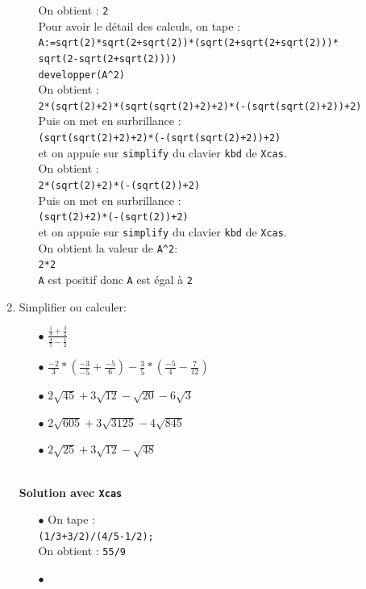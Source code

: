 \documentclass[a4paper,11pt]{book}
\begin{document}
\begin{enumerate}
\begin{itemize}
On obtient : {\tt 2}\\
Pour avoir le d\'etail des calculs, on tape :\\
{\tt A:=sqrt(2)*sqrt(2+sqrt(2))*(sqrt(2+sqrt(2+sqrt(2)))*\\sqrt(2-sqrt(2+sqrt(2))))}\\
{\tt developper(A\verb|^|2)}\\
On obtient :\\
{\tt 2*(sqrt(2)+2)*(sqrt(sqrt(2)+2)+2)*(-(sqrt(sqrt(2)+2))+2)}\\
Puis on met en surbrillance : \\
{\tt (sqrt(sqrt(2)+2)+2)*(-(sqrt(sqrt(2)+2))+2)}\\
et on appuie sur {\tt simplify} du clavier {\tt kbd} de {\tt Xcas}.\\
On obtient :\\
{\tt 2*(sqrt(2)+2)*(-(sqrt(2))+2)}\\
Puis on met en surbrillance : \\
{\tt (sqrt(2)+2)*(-(sqrt(2))+2)}\\
et on appuie sur {\tt simplify} du clavier {\tt kbd} de {\tt Xcas}.\\
On obtient la valeur de {\tt A\verb|^|2}:\\
{\tt 2*2}\\
{\tt A} est positif donc {\tt A} est \'egal \`a {\tt 2}
\end{itemize}
\item Simplifier ou calculer:
\begin{itemize}
\item[$\bullet$] $\displaystyle \frac{\displaystyle\frac{1}{3}+\frac{3}{2}}{\displaystyle\frac{4}{5}-\frac{1}{2}}$
\item[$\bullet$] $\displaystyle \frac{-2}{3}*(\frac{-3}{-5}+\frac{-5}{6})-\frac{3}{5}*(\frac{-5}{4}-\frac{7}{12})$
\item[$\bullet$] $2\sqrt{45}+3\sqrt{12}-\sqrt{20}-6\sqrt 3$
\item[$\bullet$] $2\sqrt{605}+3\sqrt{3125}-4\sqrt{845}$
\item[$\bullet$] $2\sqrt{25}+3\sqrt{12}-\sqrt{48}$
\end{itemize}
\ \\
{\bf Solution avec {\tt Xcas}}
\begin{itemize}
\item[$\bullet$]
On tape :\\
{\tt (1/3+3/2)/(4/5-1/2);}\\
On obtient : {\tt 55/9}
\item[$\bullet$]

\end{itemize}
\end{enumerate}
\end{document}
